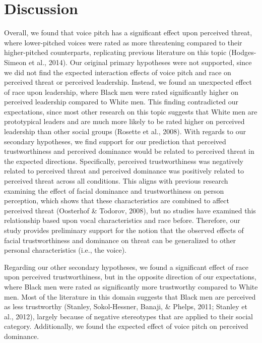 \documentclass[
  english,
  man, noextraspace,floatsintext]{apa6}
\begin{document}
\hypertarget{discussion}{%
\section{Discussion}\label{discussion}}

Overall, we found that voice pitch has a significant effect upon perceived threat, where lower-pitched voices were rated as more threatening compared to their higher-pitched counterparts, replicating previous literature on this topic (Hodges-Simeon et al., 2014). Our original primary hypotheses were not supported, since we did not find the expected interaction effects of voice pitch and race on perceived threat or perceived leadership. Instead, we found an unexpected effect of race upon leadership, where Black men were rated significantly higher on perceived leadership compared to White men. This finding contradicted our expectations, since most other research on this topic suggests that White men are prototypical leaders and are much more likely to be rated higher on perceived leadership than other social groups (Rosette et al., 2008). With regards to our secondary hypotheses, we find support for our prediction that perceived trustworthiness and perceived dominance would be related to perceived threat in the expected directions. Specifically, perceived trustworthiness was negatively related to perceived threat and perceived dominance was positively related to perceived threat across all conditions. This aligns with previous research examining the effect of facial dominance and trustworthiness on person perception, which shows that these characteristics are combined to affect perceived threat (Oosterhof \& Todorov, 2008), but no studies have examined this relationship based upon vocal characteristics and race before. Therefore, our study provides preliminary support for the notion that the observed effects of facial trustworthiness and dominance on threat can be generalized to other personal characteristics (i.e., the voice).

Regarding our other secondary hypotheses, we found a significant effect of race upon perceived trustworthiness, but in the opposite direction of our expectations, where Black men were rated as significantly more trustworthy compared to White men. Most of the literature in this domain suggests that Black men are perceived as less trustworthy (Stanley, Sokol-Hessner, Banaji, \& Phelps, 2011; Stanley et al., 2012), largely because of negative stereotypes that are applied to their social category. Additionally, we found the expected effect of voice pitch on perceived dominance.
\end{document}
